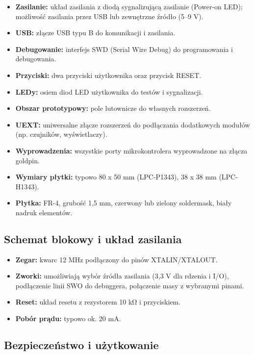 \documentclass[a4paper,12pt]{report}
\begin{document}
\begin{itemize}
    \item \textbf{Zasilanie:} układ zasilania z diodą sygnalizującą zasilanie (Power-on LED); możliwość zasilania przez USB lub zewnętrzne źródło (5–9 V).
    \item \textbf{USB:} złącze USB typu B do komunikacji i zasilania.
    \item \textbf{Debugowanie:} interfejs SWD (Serial Wire Debug) do programowania i debugowania.
    \item \textbf{Przyciski:} dwa przyciski użytkownika oraz przycisk RESET.
    \item \textbf{LEDy:} osiem diod LED użytkownika do testów i sygnalizacji.
    \item \textbf{Obszar prototypowy:} pole lutownicze do własnych rozszerzeń.
    \item \textbf{UEXT:} uniwersalne złącze rozszerzeń do podłączania dodatkowych modułów (np. czujników, wyświetlaczy).
    \item \textbf{Wyprowadzenia:} wszystkie porty mikrokontrolera wyprowadzone na złącza goldpin.
    \item \textbf{Wymiary płytki:} typowo 80 x 50 mm (LPC-P1343), 38 x 38 mm (LPC-H1343).
    \item \textbf{Płytka:} FR-4, grubość 1,5 mm, czerwony lub zielony soldermask, biały nadruk elementów.
\end{itemize}

\subsection*{Schemat blokowy i układ zasilania}

\begin{itemize}
    \item \textbf{Zegar:} kwarc 12 MHz podłączony do pinów XTALIN/XTALOUT.
    \item \textbf{Zworki:} umożliwiają wybór źródła zasilania (3,3 V dla rdzenia i I/O), podłączenie linii SWO do debuggera, połączenie masy z wybranymi pinami.
    \item \textbf{Reset:} układ resetu z rezystorem 10 k\si{\ohm} i przyciskiem.
    \item \textbf{Pobór prądu:} typowo ok. 20 mA.
\end{itemize}

\subsection*{Bezpieczeństwo i użytkowanie}
\end{document}
